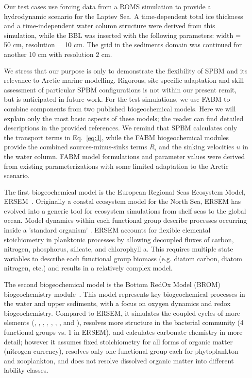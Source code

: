\documentclass[gmd, manuscript]{copernicus}
\begin{document}
Our test cases use forcing data from a \textrm{ROMS} simulation to provide a hydrodynamic scenario for the Laptev Sea.
A time-dependent total ice thickness and a time-independent water column structure were derived from this simulation, while the \textrm{BBL} was inserted with the following parameters: width = 50 \unit{cm}, resolution = 10 \unit{cm}. The grid in the sediments domain was continued for another 10 \unit{cm} with resolution 2 \unit{cm}.

We stress that our purpose is only to demonstrate the flexibility of \textrm{SPBM} and its relevance to Arctic marine modelling.
Rigorous, site-specific adaptation and skill assessment of particular \textrm{SPBM} configurations is not within our present remit, but is anticipated in future work.
For the test simulations, we use \textrm{FABM} to combine components from two published biogeochemical models.
Here we will explain only the most basic aspects of these models; the reader can find detailed descriptions in the provided references.
We remind that \textrm{SPBM} calculates only the transport terms in Eq.~\ref{eq:1}, while the \textrm{FABM} biogeochemical modules provide the combined sources-minus-sinks terms $R_{i}$ and the sinking velocities $u$ in the water column.
\textrm{FABM} model formulations and parameter values were derived from existing parameterizations with some limited adaptation to the Arctic scenario.

The first biogeochemical model is the European Regional Seas Ecosystem Model, \textrm{ERSEM}~\citep{ersem2016}.
Originally a coastal ecosystem model for the North Sea, \textrm{ERSEM} has evolved into a generic tool for ecosystem simulations from shelf seas to the global ocean.
Model dynamics within each functional group describe processes occurring inside a 'standard organism' \citep{Baretta1995, Vichi2007_1}.
\textrm{ERSEM} accounts for flexible elemental stoichiometry in planktonic processes by allowing decoupled fluxes of carbon, nitrogen, phosphorus, silicate, and chlorophyll a.
This requires multiple state variables to describe each functional group biomass (e.g. diatom carbon, diatom nitrogen, etc.) and results in a relatively complex model.

The second biogeochemical model is the Bottom RedOx Model (\textrm{BROM}) biogeochemistry module~\citep{Yakushev2017}.
This model represents key biogeochemical processes in the water and upper sediments, with a focus on oxygen dynamics and redox biogeochemistry.
Compared to \textrm{ERSEM}, it simulates the coupled cycles of more elements (, , , , , , , and ), resolves more structure in the bacterial community (4 functional groups vs. 1 in \textrm{ERSEM}), and calculates carbonate chemistry in more detail;
however it assumes fixed stoichiometry for all forms of organic matter (nitrogen currency), resolves only one functional group each for phytoplankton and zooplankton, and does not resolve dissolved organic matter into different lability classes.
\end{document}
